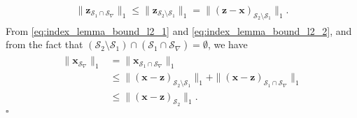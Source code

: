 \documentclass[journal]{IEEEtran}
\newcommand{\mbx}{\mathbf{x}}
\newcommand*{\QEDB}{\hfill\ensuremath{\square}}%
\begin{document}
\begin{eqnarray}
\label{eq:index_lemma_bound_l2_2}
\begin{array}{l}
\|{\mathbf{z}}_{\mathcal{S}_1\cap\mathcal{S}_{\nabla}}\|_1  \leq \|{\mathbf{z}}_{\mathcal{S}_2\setminus \mathcal{S}_1}\|_1 = \|\left( {\mathbf{z}}- \mbx \right)_{\mathcal{S}_2\setminus\mathcal{S}_1}\|_1.
\end{array}
\end{eqnarray}
From \eqref{eq:index_lemma_bound_l2_1} and \eqref{eq:index_lemma_bound_l2_2}, and from the fact that $(\mathcal{S}_2\setminus\mathcal{S}_1)\cap(\mathcal{S}_1\cap\mathcal{S}_{\nabla}) = \emptyset$, we have
\begin{eqnarray*}
\begin{array}{rl}
\|\mbx_{\mathcal{S}_{\nabla}}\|_1 & = \|\mbx_{\mathcal{S}_1\cap\mathcal{S}_{\nabla}}\|_1 \\
& \leq \|\left(  \mbx - {\mathbf{z}} \right)_{\mathcal{S}_2\setminus\mathcal{S}_1}\|_1 + \| \left(\mbx - {\mathbf{z}}\right)_{\mathcal{S}_1\cap\mathcal{S}_{\nabla}}\|_1 \\
& \leq \|\left(\mbx - {\mathbf{z}}\right)_{\mathcal{S}_2}\|_1.
\end{array}
\end{eqnarray*} \QEDB
\end{document}
